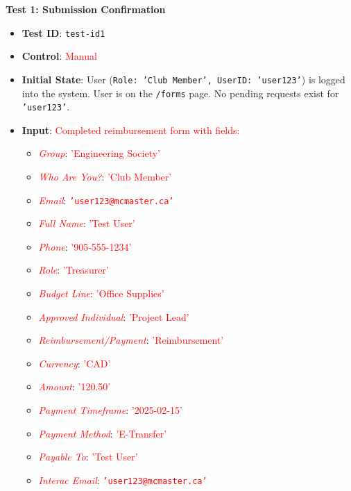 \documentclass[12pt, titlepage]{article}
\begin{document}
\textbf{Test 1: Submission Confirmation} \label{test-id1}
\begin{itemize}
    \item \textbf{Test ID}: \texttt{test-id1}
    \item \textbf{Control}: \textcolor{red}{Manual}
    \item \textbf{Initial State}: User (\texttt{Role: 'Club Member', UserID: 'user123'}) is logged into the system. User is on the \texttt{/forms} page. No pending requests exist for \texttt{'user123'}.
    \item \textbf{Input}: \textcolor{red}{Completed reimbursement form with fields:}
        \begin{itemize}
            \item \textit{\textcolor{red}{Group}}: \textcolor{red}{'Engineering Society'}
            \item \textit{\textcolor{red}{Who Are You?}}: \textcolor{red}{'Club Member'}
            \item \textit{\textcolor{red}{Email}}: \textcolor{red}{\texttt{'user123@mcmaster.ca'}}
            \item \textit{\textcolor{red}{Full Name}}: \textcolor{red}{'Test User'}
            \item \textit{\textcolor{red}{Phone}}: \textcolor{red}{'905-555-1234'}
            \item \textit{\textcolor{red}{Role}}: \textcolor{red}{'Treasurer'}
            \item \textit{\textcolor{red}{Budget Line}}: \textcolor{red}{'Office Supplies'}
            \item \textit{\textcolor{red}{Approved Individual}}: \textcolor{red}{'Project Lead'}
            \item \textit{\textcolor{red}{Reimbursement/Payment}}: \textcolor{red}{'Reimbursement'}
            \item \textit{\textcolor{red}{Currency}}: \textcolor{red}{'CAD'}
            \item \textit{\textcolor{red}{Amount}}: \textcolor{red}{'120.50'}
            \item \textit{\textcolor{red}{Payment Timeframe}}: \textcolor{red}{'2025-02-15'}
            \item \textit{\textcolor{red}{Payment Method}}: \textcolor{red}{'E-Transfer'}
            \item \textit{\textcolor{red}{Payable To}}: \textcolor{red}{'Test User'}
            \item \textit{\textcolor{red}{Interac Email}}: \textcolor{red}{\texttt{'user123@mcmaster.ca'}}

\end{itemize}
\end{itemize}
\end{document}
